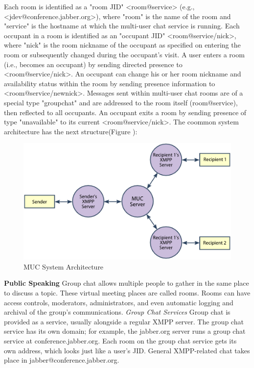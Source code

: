 Each room is identified as a "room JID" <room@service> (e.g., <jdev@conference.jabber.org>), where "room" is the name of the room and "service" is the hostname at which the multi-user chat service is running. Each occupant in a room is identified as an "occupant JID" <room@service/nick>, where "nick" is the room nickname of the occupant as specified on entering the room or subsequently changed during the occupant's visit. A user enters a room (i.e., becomes an occupant) by sending directed presence to <room@service/nick>. An occupant can change his or her room nickname and availability status within the room by sending presence information to <room@service/newnick>. Messages sent within multi-user chat rooms are of a special type "groupchat" and are addressed to the room itself (room@service), then reflected to all occupants. An occupant exits a room by sending presence of type "unavailable" to its current <room@service/nick>.
The coommon system architecture has the next structure(Figure ):
  \begin{figure}[!ht]
		\centering
		\includegraphics[scale=0.8]{images/MUC.png}   
		\caption[MUC]{MUC System Architecture}                         
		\end{figure}

\textbf{Public Speaking}
\newline
Group chat allows multiple people to gather in the same place to discuss a topic. These virtual meeting places are called rooms. Rooms can have access controls, moderators, administrators, and even automatic logging and archival of the group’s communications.
\emph{Group Chat Services}
\newline
Group chat is provided as a service, usually alongside a regular XMPP server. The group chat service has its own domain; for example, the jabber.org server runs a group chat service at conference.jabber.org. Each room on the group chat service gets its own address, which looks just like a user’s JID. General XMPP-related chat takes place in jabber@conference.jabber.org.

